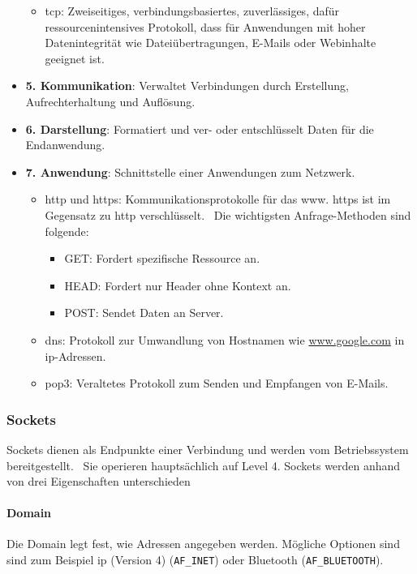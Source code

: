 \documentclass[11pt, a4paper]{article}
\begin{document}
\begin{itemize}
\begin{itemize}
		\item \gls{tcp}: Zweiseitiges, verbindungsbasiertes, zuverlässiges, dafür ressourcenintensives Protokoll, dass für Anwendungen mit hoher Datenintegrität wie Dateiübertragungen, E-Mails oder Webinhalte geeignet ist.
	\end{itemize}
	\item \textbf{5. Kommunikation}: Verwaltet Verbindungen durch Erstellung, Aufrechterhaltung und Auflösung.
	\item \textbf{6. Darstellung}: Formatiert und ver- oder entschlüsselt Daten für die Endanwendung.
	\item \textbf{7. Anwendung}: Schnittstelle einer Anwendungen zum Netzwerk.
	\begin{itemize}
		\item \gls{http} und \gls{https}: Kommunikationsprotokolle für das \gls{www}. \gls{https} ist im Gegensatz zu \gls{http} verschlüsselt.~\cite{HTTPWiki6:online, HTTPvers49:online} Die wichtigsten Anfrage-Methoden sind folgende:
		\begin{itemize}
			\item GET: Fordert spezifische Ressource an.
			\item HEAD: Fordert nur Header ohne Kontext an.
			\item POST: Sendet Daten an Server.
		\end{itemize}
		\item \gls{dns}: Protokoll zur Umwandlung von Hostnamen wie \url{www.google.com} in \gls{ip}-Adressen.
		\item \gls{pop3}: Veraltetes Protokoll zum Senden und Empfangen von E-Mails.~\cite{Pop3microsoft:online}
	\end{itemize}
\end{itemize}

\subsubsection{Sockets}
Sockets dienen als Endpunkte einer Verbindung und werden vom Betriebssystem bereitgestellt.~\cite{SocketW33:online} Sie operieren hauptsächlich auf Level 4. Sockets werden anhand von drei Eigenschaften unterschieden
\paragraph{Domain}
Die Domain legt fest, wie Adressen angegeben werden. Mögliche Optionen sind sind zum Beispiel \gls{ip} (Version 4) (\texttt{AF\_INET}) oder Bluetooth (\texttt{AF\_BLUETOOTH}).
\end{document}
